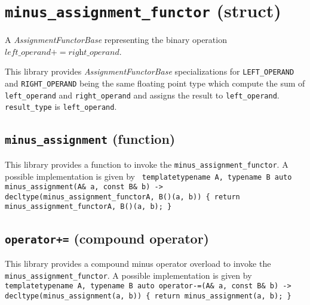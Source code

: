 \section{\texttt{minus\_assignment\_functor} (struct)}
A \textit{AssignmentFunctorBase} representing the binary operation $\textit{left\_operand} += \textit{right\_operand}$.\newline

\noindent{}This library provides \textit{AssignmentFunctorBase} specializations for
\texttt{LEFT\_OPERAND} and \texttt{RIGHT\_OPERAND} being the same    floating point
type which compute  the sum of  \texttt{left\_operand} and \texttt{right\_operand}
and assigns the result to \texttt{left\_operand}.
\texttt{result\_type} is \texttt{left\_operand}.

\subsection{\texttt{minus\_assignment} (function)}
This library provides a function to invoke the \texttt{minus\_assignment\_functor}.
A possible implementation is given by\newline
\texttt{
template\textlangle typename A, typename B\textrangle\newline
auto minus\_assignment(A\& a, const B\& b) -> decltype(minus\_assignment\_functor\textlangle A, B\textrangle()(a, b))\newline
\{ return minus\_assignment\_functor\textlangle A, B\textrangle()(a, b); \}
}

\subsection{\texttt{operator+=} (compound operator)}
This library provides a compound minus operator overload to invoke the \texttt{minus\_assignment\_functor}.
A possible implementation is given by\newline
\texttt{
template\textlangle typename A, typename B\textrangle\newline
auto operator-=(A\& a, const B\& b) -> decltype(minus\_assignment(a, b))\newline
\{ return minus\_assignment(a, b); \}
}